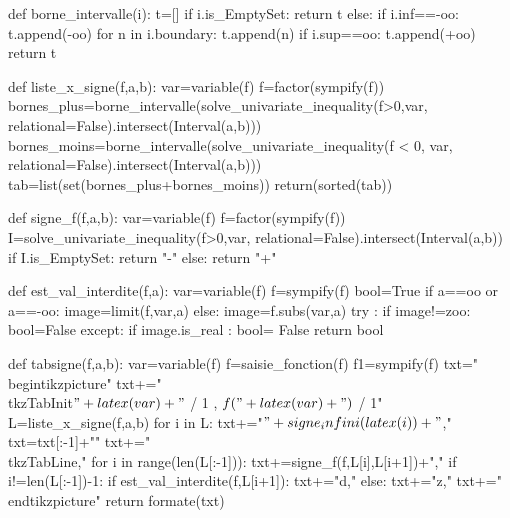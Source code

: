 \begin{pycode}
def borne_intervalle(i):
    t=[]
    if i.is_EmptySet:
        return t
    else:
        if i.inf==-oo:
            t.append(-oo)
        for n in i.boundary:
            t.append(n)
        if i.sup==oo:
            t.append(+oo)
        return t

def liste_x_signe(f,a,b):
    var=variable(f)
    f=factor(sympify(f))
    bornes_plus=borne_intervalle(solve_univariate_inequality(f>0,var, relational=False).intersect(Interval(a,b)))
    bornes_moins=borne_intervalle(solve_univariate_inequality(f < 0, var, relational=False).intersect(Interval(a,b)))
    tab=list(set(bornes_plus+bornes_moins))
    return(sorted(tab))


def signe_f(f,a,b):
    var=variable(f)
    f=factor(sympify(f))
    I=solve_univariate_inequality(f>0,var, relational=False).intersect(Interval(a,b))
    if I.is_EmptySet:
        return "-"
    else:
        return "+"


def est_val_interdite(f,a):
    var=variable(f)
    f=sympify(f)
    bool=True
    if a==oo or a==-oo:
        image=limit(f,var,a)
    else:
        image=f.subs(var,a)
    try :
        if image!=zoo:
            bool=False
    except:
        if  image.is_real :
            bool= False
    return bool


def tabsigne(f,a,b):
        var=variable(f)
        f=saisie_fonction(f)
        f1=sympify(f)
        txt="\n \\begin{tikzpicture}"
        txt+="\n \\tkzTabInit{$"+latex(var)+"$ / 1 , $f("+latex(var)+")$ / 1}{"
        L=liste_x_signe(f,a,b)
        for i in L:
            txt+="$"+signe_infini(latex(i))+"$,"
        txt=txt[:-1]+"}"
        txt+="\n \\tkzTabLine{,"
        for i in range(len(L[:-1])):
            txt+=signe_f(f,L[i],L[i+1])+","
            if i!=len(L[:-1])-1:
                if est_val_interdite(f,L[i+1]):
                    txt+="d,"
                else:
                    txt+="z,"
        txt+="}\\end{tikzpicture}"
        return formate(txt)

\end{pycode}